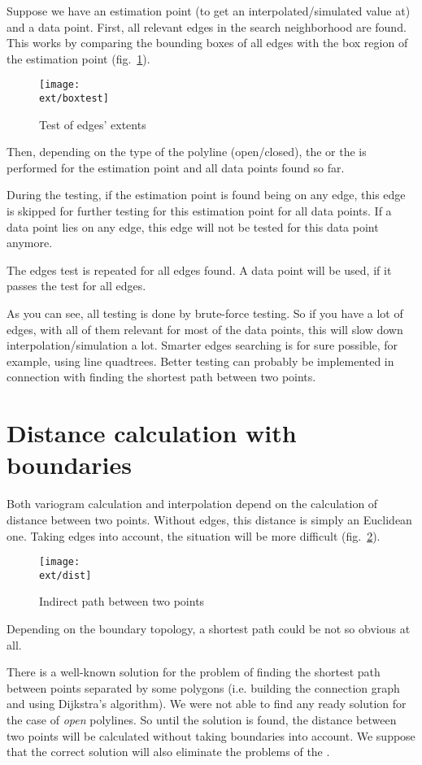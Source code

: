 Suppose we have an estimation point (to get an interpolated/simulated
value at) and a data point. First, all relevant edges in the search
neighborhood are found. This works by comparing the bounding boxes of
all edges with the box region of the estimation point (fig.~\ref{fig:boxtest}).

\begin{figure}[htbp]
  \centering
  \texttt{[image: \\ext/boxtest]}
  \caption{Test of edges' extents}
  \label{fig:boxtest}
\end{figure}


Then, depending on the type of the polyline (open/closed), the \lost{}
or the \pipt{}  is performed for the estimation point and all data
points found so far.


During the testing, if the estimation point is found being on any
edge, this edge is skipped for further testing for this estimation
point for all data points. If a data point lies on any edge, this edge
will not be tested for this data point anymore.

The edges test is repeated for all edges found. A data point will be
used, if it passes the test for all edges.

As you can see, all testing is done by brute-force testing. So if you
have a lot of edges, with all of them relevant for most of the data
points, this will slow down interpolation/simulation a lot. Smarter
edges searching is for sure possible, for example, using line
quadtrees.  Better testing can probably be implemented in
connection with finding the shortest path between two points.



\section{Distance calculation with boundaries}
\label{sec:Vari-calc}

Both variogram calculation and interpolation depend on the
calculation of distance between two points. Without edges, this
distance is simply an Euclidean one. Taking edges into account, the
situation will be more difficult (fig.~\ref{fig:indirect}).

\begin{figure}[htbp]
  \centering
  \texttt{[image: \\ext/dist]}
  \caption{Indirect path between two points}
  \label{fig:indirect}
\end{figure}

Depending on the boundary topology, a shortest path could be not so
obvious at all.

There is a well-known solution for the problem of finding the shortest
path between points separated by some polygons (i.e. building the
connection graph and using Dijkstra's algorithm). We were not able to
find any ready solution for the case of \emph{open} polylines. So
until the solution is found, the distance between two points will be
calculated without taking boundaries into account. We suppose that the
correct solution will also eliminate the problems of the \lost.
